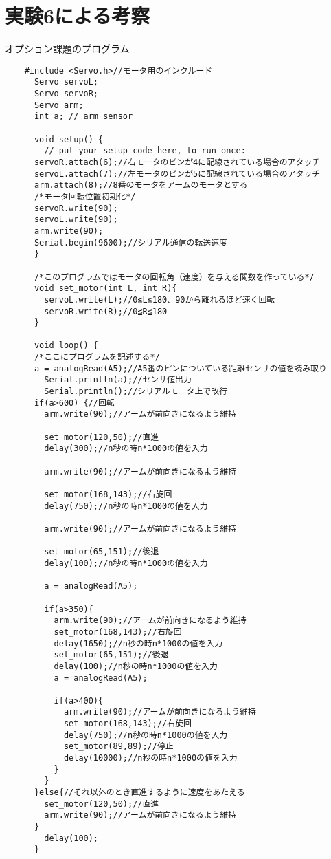 \documentclass{jsarticle}
\begin{document}
\section{実験6による考察}
  オプション課題のプログラム
    \begin{verbatim}
    #include <Servo.h>//モータ用のインクルード
      Servo servoL;
      Servo servoR;
      Servo arm;
      int a; // arm sensor

      void setup() {
        // put your setup code here, to run once:
      servoR.attach(6);//右モータのピンが4に配線されている場合のアタッチ
      servoL.attach(7);//左モータのピンが5に配線されている場合のアタッチ
      arm.attach(8);//8番のモータをアームのモータとする
      /*モータ回転位置初期化*/
      servoR.write(90);
      servoL.write(90);
      arm.write(90);
      Serial.begin(9600);//シリアル通信の転送速度
      }

      /*このプログラムではモータの回転角（速度）を与える関数を作っている*/
      void set_motor(int L, int R){
        servoL.write(L);//0≦L≦180、90から離れるほど速く回転
        servoR.write(R);//0≦R≦180
      }

      void loop() {
      /*ここにプログラムを記述する*/
      a = analogRead(A5);//A5番のピンについている距離センサの値を読み取り
        Serial.println(a);//センサ値出力
        Serial.println();//シリアルモニタ上で改行
      if(a>600) {//回転
        arm.write(90);//アームが前向きになるよう維持

        set_motor(120,50);//直進
        delay(300);//n秒の時n*1000の値を入力

        arm.write(90);//アームが前向きになるよう維持

        set_motor(168,143);//右旋回
        delay(750);//n秒の時n*1000の値を入力

        arm.write(90);//アームが前向きになるよう維持

        set_motor(65,151);//後退
        delay(100);//n秒の時n*1000の値を入力

        a = analogRead(A5);

        if(a>350){
          arm.write(90);//アームが前向きになるよう維持
          set_motor(168,143);//右旋回
          delay(1650);//n秒の時n*1000の値を入力
          set_motor(65,151);//後退
          delay(100);//n秒の時n*1000の値を入力
          a = analogRead(A5);

          if(a>400){
            arm.write(90);//アームが前向きになるよう維持
            set_motor(168,143);//右旋回
            delay(750);//n秒の時n*1000の値を入力
            set_motor(89,89);//停止
            delay(10000);//n秒の時n*1000の値を入力
          }
        }
      }else{//それ以外のとき直進するように速度をあたえる
        set_motor(120,50);//直進
        arm.write(90);//アームが前向きになるよう維持
      }
        delay(100);
      }

    \end{verbatim}
\end{document}
